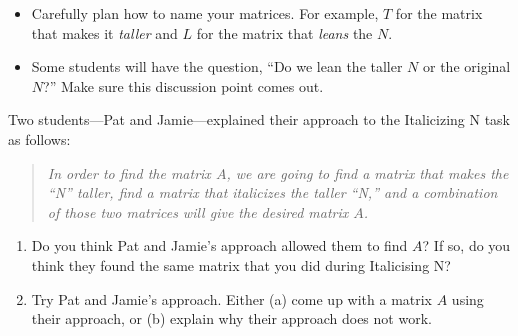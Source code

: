 \documentclass{problemset}
\begin{document}
\begin{iola}
\begin{annotation}
		\begin{notes}
			\begin{itemize}
				\item Carefully plan how to name your matrices. For example, $T$ for 
					the matrix that makes it \emph{taller} and $L$ for the matrix
					that \emph{leans} the $N$.
				\item Some students will have the question, ``Do we lean the taller $N$ or the original $N$?''
					Make sure this discussion point comes out.
					
			\end{itemize}
		\end{notes}
	\end{annotation}

Two students---Pat and Jamie---explained their approach to the Italicizing N task as follows:
\begin{quote}\itshape
	In order to find the matrix $A$, we are going to find a matrix that makes the ``N'' taller,
	find a matrix that italicizes the taller ``N,'' and a combination of those two matrices
	will give the desired matrix $A$.
\end{quote}

\begin{enumerate}
	\item Do you think Pat and Jamie's approach allowed them to find $A$?  If so, do
		you think they found the same matrix that you did during Italicising N?
	\item Try Pat and Jamie's approach.  Either (a) come up with a matrix $A$ using
		their approach, or (b) explain why their approach does not work.
\end{enumerate}

\end{iola}
\end{document}
